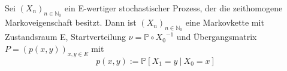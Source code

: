 Sei $(X_{n})_{n \in \mathbb{N}_{0}}$ ein E-wertiger stochastischer Prozess, der die zeithomogene Markoveigenschaft besitzt. Dann ist $(X_{n})_{n \in \mathbb{N}_{0}}$ eine Markovkette mit Zustandsraum E, Startverteilung $\nu = \mathbb{P} \circ {X_{0}}^{-1}$ und Übergangsmatrix $P =(p(x,y))_{x,y \in E}$ mit
\begin{equation*}
p(x,y) := \mathbb{P}[X_{1} = y \: | \: X_{0} = x]
\end{equation*}